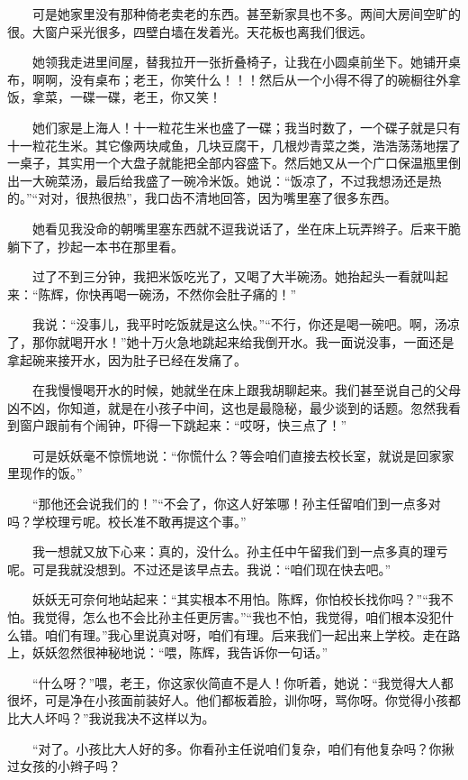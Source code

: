  　　可是她家里没有那种倚老卖老的东西。甚至新家具也不多。两间大房间空旷的很。大窗户采光很多，四壁白墙在发着光。天花板也离我们很远。 
 
 　　她领我走进里间屋，替我拉开一张折叠椅子，让我在小圆桌前坐下。她铺开桌布，啊啊，没有桌布；老王，你笑什么！！！然后从一个小得不得了的碗橱往外拿饭，拿菜，一碟一碟，老王，你又笑！ 
 
 　　她们家是上海人！十一粒花生米也盛了一碟；我当时数了，一个碟子就是只有十一粒花生米。其它像两块咸鱼，几块豆腐干，几根炒青菜之类，浩浩荡荡地摆了一桌子，其实用一个大盘子就能把全部内容盛下。然后她又从一个广口保温瓶里倒出一大碗菜汤，最后给我盛了一碗冷米饭。她说：“饭凉了，不过我想汤还是热的。”“对对，很热很热”，我口齿不清地回答，因为嘴里塞了很多东西。 
 
 　　她看见我没命的朝嘴里塞东西就不逗我说话了，坐在床上玩弄辫子。后来干脆躺下了，抄起一本书在那里看。 
 
 　　过了不到三分钟，我把米饭吃光了，又喝了大半碗汤。她抬起头一看就叫起来：“陈辉，你快再喝一碗汤，不然你会肚子痛的！” 
 
 　　我说：“没事儿，我平时吃饭就是这么快。”“不行，你还是喝一碗吧。啊，汤凉了，那你就喝开水！”她十万火急地跳起来给我倒开水。我一面说没事，一面还是拿起碗来接开水，因为肚子已经在发痛了。 
 
 　　在我慢慢喝开水的时候，她就坐在床上跟我胡聊起来。我们甚至说自己的父母凶不凶，你知道，就是在小孩子中间，这也是最隐秘，最少谈到的话题。忽然我看到窗户跟前有个闹钟，吓得一下跳起来：“哎呀，快三点了！” 
 
 　　可是妖妖毫不惊慌地说：“你慌什么？等会咱们直接去校长室，就说是回家家里现作的饭。” 
 
 　　“那他还会说我们的！”“不会了，你这人好笨哪！孙主任留咱们到一点多对吗？学校理亏呢。校长准不敢再提这个事。” 
 
 　　我一想就又放下心来：真的，没什么。孙主任中午留我们到一点多真的理亏呢。可是我就没想到。不过还是该早点去。我说：“咱们现在快去吧。” 
 
 　　妖妖无可奈何地站起来：“其实根本不用怕。陈辉，你怕校长找你吗？”“我不怕。我觉得，怎么也不会比孙主任更厉害。”“我也不怕，我觉得，咱们根本没犯什么错。咱们有理。”我心里说真对呀，咱们有理。后来我们一起出来上学校。走在路上，妖妖忽然很神秘地说：“喂，陈辉，我告诉你一句话。” 
 
 　　“什么呀？”喂，老王，你这家伙简直不是人！你听着，她说：“我觉得大人都很坏，可是净在小孩面前装好人。他们都板着脸，训你呀，骂你呀。你觉得小孩都比大人坏吗？”我说我决不这样以为。 
 
 　　“对了。小孩比大人好的多。你看孙主任说咱们复杂，咱们有他复杂吗？你揪过女孩的小辫子吗？ 
 
